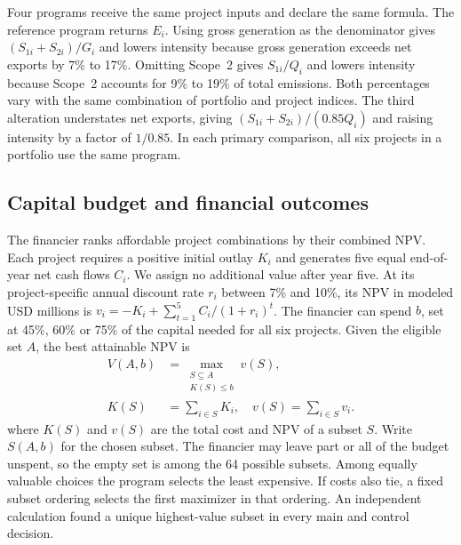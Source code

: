 Four programs receive the same project inputs and declare the same formula. The reference program returns $E_i$. Using gross generation as the denominator gives $(S_{1i}+S_{2i})/G_i$ and lowers intensity because gross generation exceeds net exports by 7\% to 17\%. Omitting Scope~2 gives $S_{1i}/Q_i$ and lowers intensity because Scope~2 accounts for 9\% to 19\% of total emissions. Both percentages vary with the same combination of portfolio and project indices. The third alteration understates net exports, giving $(S_{1i}+S_{2i})/(0.85 Q_i)$ and raising intensity by a factor of $1/0.85$. In each primary comparison, all six projects in a portfolio use the same program.

\subsection{Capital budget and financial outcomes}
The financier ranks affordable project combinations by their combined NPV. Each project requires a positive initial outlay $K_i$ and generates five equal end-of-year net cash flows $C_i$. We assign no additional value after year five. At its project-specific annual discount rate $r_i$ between 7\% and 10\%, its NPV in modeled USD millions is $v_i=-K_i+\sum_{t=1}^{5} C_i/(1+r_i)^t$. The financier can spend $b$, set at 45\%, 60\% or 75\% of the capital needed for all six projects. Given the eligible set $A$, the best attainable NPV is
\begin{equation}
\begin{aligned}
 V(A,b)&=\max_{\substack{S\subseteq A\\ K(S)\le b}}v(S),\\
 K(S)&=\sum_{i\in S}K_i,\quad v(S)=\sum_{i\in S}v_i .
 \end{aligned}\label{eq:opt}
\end{equation}
where $K(S)$ and $v(S)$ are the total cost and NPV of a subset $S$. Write $S(A,b)$ for the chosen subset. The financier may leave part or all of the budget unspent, so the empty set is among the 64 possible subsets. Among equally valuable choices the program selects the least expensive. If costs also tie, a fixed subset ordering selects the first maximizer in that ordering. An independent calculation found a unique highest-value subset in every main and control decision.

